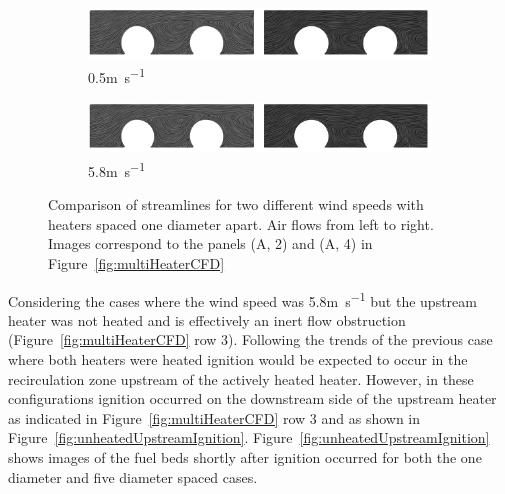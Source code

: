        \begin{figure}[hbpt]
            \centering
             \begin{subfigure}[b]{0.49\textwidth}
                \centering
                \includegraphics[width=\textwidth, trim={27cm 0 0 0},clip]{Figures/recirculationComparison.png}
                \caption{0.5\si{\meter\per\second}}
                \label{subfig:comparisonLowWind}
            \end{subfigure}
            \begin{subfigure}[b]{0.49\textwidth}
                \centering
                \includegraphics[width=\textwidth, trim={0 0 27cm 0},clip]{Figures/recirculationComparison.png}
                \caption{5.8\si{\meter\per\second}}
                \label{subfig:comparisonHighWind}
            \end{subfigure}
            \caption{Comparison of streamlines for two different wind speeds with heaters spaced one diameter apart. Air flows from left to right. Images correspond to the panels (A, 2) and (A, 4) in Figure~\ref{fig:multiHeaterCFD}}
            \label{fig:streamlineComparison}
        \end{figure}
    Considering the cases where the wind speed was 5.8\si{\meter\per\second} but the upstream heater was not heated and is effectively an inert flow obstruction (Figure~\ref{fig:multiHeaterCFD} row 3). Following the trends of the previous case where both heaters were heated ignition would be expected to occur in the recirculation zone upstream of the actively heated heater. However, in these configurations ignition occurred on the downstream side of the upstream heater as indicated in Figure~\ref{fig:multiHeaterCFD} row 3 and as shown in Figure~\ref{fig:unheatedUpstreamIgnition}. Figure~\ref{fig:unheatedUpstreamIgnition} shows images of the fuel beds shortly after ignition occurred for both the one diameter and five diameter spaced cases. 
